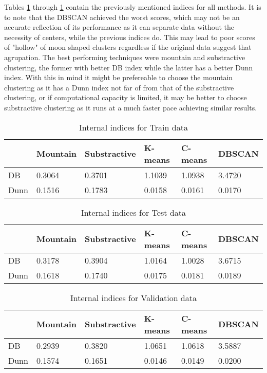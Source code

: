 Tables \ref{tab:external:train} through \ref{tab:external:train} contain the
previously mentioned indices for all methods. It is to note that the DBSCAN 
achieved the worst scores, which may not be an accurate reflection of its
performance as it can separate data without the necessity of centers, while the
previous indices do. This may lead to poor scores of "hollow" of moon shaped
clusters regardless if the original data suggest that agrupation. The best 
performing techniques were mountain and substractive clustering, the former with
better DB index while the latter has a better Dunn index. With this in mind
it might be prefereable to choose the mountain clustering as it has a Dunn index
not far of from that of the substractive clustering, or if computational capacity
is limited, it may be better to choose substractive clustering as it runs
at a much faster pace achieving similar results.

\begin{table}
    \begin{tabular}{l|lllll}
             & Mountain & Substractive & K-means & C-means & DBSCAN\\\hline
        DB   & 0.3064 & 0.3701 & 1.1039 & 1.0938 & 3.4720\\
        Dunn & 0.1516 & 0.1783 & 0.0158 & 0.0161 & 0.0170
    \end{tabular}
    \caption{Internal indices for Train data\label{tab:external:train}}
\end{table}

\begin{table}
    \begin{tabular}{l|lllll}
             & Mountain & Substractive & K-means & C-means & DBSCAN\\\hline
        DB   & 0.3178 & 0.3904 & 1.0164 & 1.0028 & 3.6715\\
        Dunn & 0.1618 & 0.1740 & 0.0175 & 0.0181 & 0.0189
    \end{tabular}
    \caption{Internal indices for Test data\label{tab:external:test}}
\end{table}

\begin{table}
    \begin{tabular}{l|lllll}
             & Mountain & Substractive & K-means & C-means & DBSCAN\\\hline
        DB   & 0.2939 & 0.3820 & 1.0651 & 1.0618 & 3.5887\\
        Dunn & 0.1574 & 0.1651 & 0.0146 & 0.0149 & 0.0200
    \end{tabular}
    \caption{Internal indices for Validation data\label{tab:external:validation}}
\end{table}


